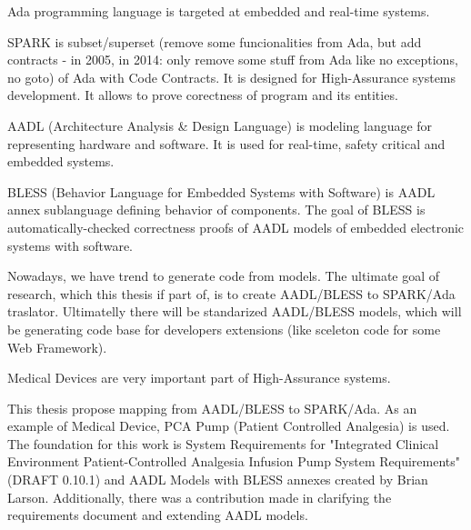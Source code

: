 
\pagestyle{empty}
\setlength{\baselineskip}{0.8cm}



Ada programming language is targeted at embedded and real-time systems.

SPARK is subset/superset (remove some funcionalities from Ada, but add contracts - in 2005, in 2014: only remove some stuff from Ada like no exceptions, no goto) of Ada with Code Contracts. It is designed for High-Assurance systems development. It allows to prove corectness of program and its entities.

AADL (Architecture Analysis \& Design Language) is modeling language for representing hardware and software. It is used for real-time, safety critical and embedded systems.

BLESS (Behavior Language for Embedded Systems with Software) is AADL annex sublanguage defining behavior of components. The goal of BLESS is automatically-checked correctness proofs of AADL models of embedded electronic systems with software.

Nowadays, we have trend to generate code from models. The ultimate goal of research, which this thesis if part of, is to create AADL/BLESS to SPARK/Ada traslator. Ultimatelly there will be standarized AADL/BLESS models, which will be generating code base for developers extensions (like sceleton code for some Web Framework).

Medical Devices are very important part of High-Assurance systems.

This thesis propose mapping from AADL/BLESS to SPARK/Ada. As an example of Medical Device, PCA Pump (Patient Controlled Analgesia) is used. The foundation for this work is System Requirements for "Integrated Clinical Environment Patient-Controlled Analgesia Infusion Pump System Requirements" (DRAFT 0.10.1) \cite{Lar14} and AADL Models with BLESS annexes created by Brian Larson. Additionally, there was a contribution made in clarifying the requirements document and extending AADL models.
